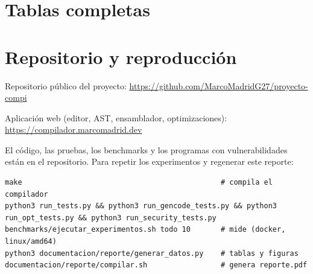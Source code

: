 \documentclass[11pt,a4paper]{article}
\begin{document}
\appendix
\section{Tablas completas}
\label{ap:tablas}
\begin{table}[H]
\centering\scriptsize
\resizebox{\textwidth}{!}{}
\caption{Tiempo medio (ms) de cada pase aplicado solo.}
\end{table}
\begin{table}[H]
\centering\scriptsize
\resizebox{\textwidth}{!}{}
\caption{Tiempo medio (ms) con cada mecanismo de seguridad.}
\end{table}

\section{Repositorio y reproducción}
Repositorio público del proyecto: \url{https://github.com/MarcoMadridG27/proyecto-compi}

Aplicación web (editor, AST, ensamblador, optimizaciones): \url{https://compilador.marcomadrid.dev}

El código, las pruebas, los benchmarks y los programas con vulnerabilidades están en el repositorio. Para repetir
los experimentos y regenerar este reporte:
\begin{lstlisting}
make                                              # compila el compilador
python3 run_tests.py && python3 run_gencode_tests.py && python3 run_opt_tests.py && python3 run_security_tests.py
benchmarks/ejecutar_experimentos.sh todo 10       # mide (docker, linux/amd64)
python3 documentacion/reporte/generar_datos.py    # tablas y figuras
documentacion/reporte/compilar.sh                 # genera reporte.pdf
\end{lstlisting}
\end{document}
